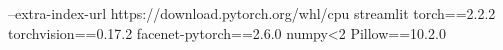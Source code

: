 --extra-index-url https://download.pytorch.org/whl/cpu
streamlit
torch==2.2.2
torchvision==0.17.2
facenet-pytorch==2.6.0
numpy<2
Pillow==10.2.0
